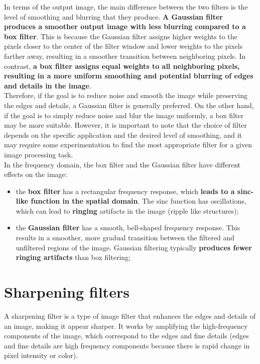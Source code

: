 \documentclass{article}
\begin{document}
In terms of the output image, the main difference between the two filters is the level of smoothing and blurring that they produce. \textbf{A Gaussian filter produces a smoother output image with less blurring compared to a box filter}. This is because the Gaussian filter assigns higher weights to the pixels closer to the center of the filter window and lower weights to the pixels farther away, resulting in a smoother transition between neighboring pixels. In contrast, \textbf{a box filter assigns equal weights to all neighboring pixels, resulting in a more uniform smoothing and potential blurring of edges and details in the image}. \\

Therefore, if the goal is to reduce noise and smooth the image while preserving the edges and details, a Gaussian filter is generally preferred. On the other hand, if the goal is to simply reduce noise and blur the image uniformly, a box filter may be more suitable. However, it is important to note that the choice of filter depends on the specific application and the desired level of smoothing, and it may require some experimentation to find the most appropriate filter for a given image processing task. \\

In the frequency domain, the box filter and the Gaussian filter have different effects on the image:

\begin{itemize}
    \item the \textbf{box filter} has a rectangular frequency response, which \textbf{leads to a sinc-like function in the spatial domain}. The sinc function has oscillations, which can lead to \textbf{ringing} artifacts in the image (ripple like structures);
    \item the \textbf{Gaussian filter} has a smooth, bell-shaped frequency response. This results in a smoother, more gradual transition between the filtered and unfiltered regions of the image. Gaussian filtering typically \textbf{produces fewer ringing artifacts} than box filtering;
\end{itemize}

\newpage

\section*{Sharpening filters}

A sharpening filter is a type of image filter that enhances the edges and details of an image, making it appear sharper. It works by amplifying the high-frequency components of the image, which correspond to the edges and fine details (edges and fine details are high frequency components because there is rapid change in pixel intensity or color). \\
\end{document}
